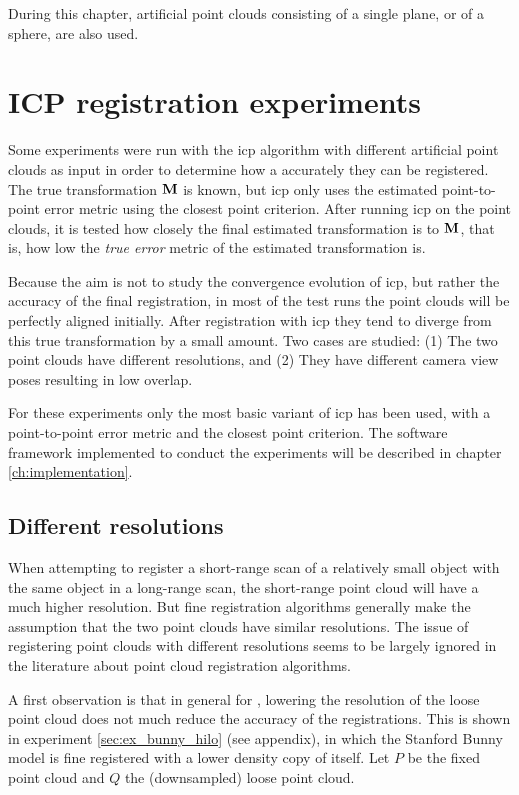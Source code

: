 During this chapter, artificial point clouds consisting of a single plane, or of a sphere, are also used.

\FloatBarrier

\newpage



\section{ICP registration experiments} \label{sec:icp_reg_exp}
Some experiments were run with the \gls{icp} algorithm with different artificial point clouds as input in order to determine how a accurately they can be registered. The true transformation $\mathbf{M}$ is known, but \gls{icp} only uses the estimated point-to-point error metric using the closest point criterion. After running \gls{icp} on the point clouds, it is tested how closely the final estimated transformation is to $\mathbf{M}$, that is, how low the \emph{true error} metric of the estimated transformation is.

Because the aim is not to study the convergence evolution of \gls{icp}, but rather the accuracy of the final registration, in most of the test runs the point clouds will be perfectly aligned initially. After registration with \gls{icp} they tend to diverge from this true transformation by a small amount. Two cases are studied: (1) The two point clouds have different resolutions, and (2) They have different camera view poses resulting in low overlap.

For these experiments only the most basic variant of \gls{icp} has been used, with a point-to-point error metric and the closest point criterion. The software framework implemented to conduct the experiments will be described in chapter \ref{ch:implementation}.

\subsection{Different resolutions}
When attempting to register a short-range scan of a relatively small object with the same object in a long-range scan, the short-range point cloud will have a much higher resolution. But fine registration algorithms generally make the assumption that the two point clouds have similar resolutions. The issue of registering point clouds with different resolutions seems to be largely ignored in the literature about point cloud registration algorithms.

A first observation is that in general for , lowering the resolution of the loose point cloud does not much reduce the accuracy of the registrations. This is shown in experiment \ref{sec:ex_bunny_hilo} (see appendix), in which the Stanford Bunny model is fine registered with a lower density copy of itself. Let $P$ be the fixed point cloud and $Q$ the (downsampled) loose point cloud.

